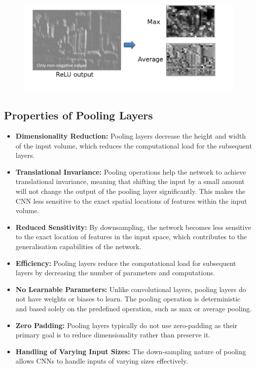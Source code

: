 \begin{figure}[H]
    \centering
    \includegraphics[width=0.5\linewidth]{img/max_avg_pool.png}
    
    
\end{figure}

\subsection{Properties of Pooling Layers}

\begin{itemize}
    \item \textbf{Dimensionality Reduction:} Pooling layers decrease the height and width of the input volume, which reduces the computational load for the subsequent layers.
    \item \textbf{Translational Invariance:} Pooling operations help the network to achieve translational invariance, meaning that shifting the input by a small amount will not change the output of the pooling layer significantly. This makes the CNN less sensitive to the exact spatial locations of features within the input volume.
    \item \textbf{Reduced Sensitivity:} By downsampling, the network becomes less sensitive to the exact location of features in the input space, which contributes to the generalisation capabilities of the network.
    \item \textbf{Efficiency:} Pooling layers reduce the computational load for subsequent layers by decreasing the number of parameters and computations.
    \item \textbf{No Learnable Parameters:} Unlike convolutional layers, pooling layers do not have weights or biases to learn. The pooling operation is deterministic and based solely on the predefined operation, such as max or average pooling.
    \item \textbf{Zero Padding:} Pooling layers typically do not use zero-padding as their primary goal is to reduce dimensionality rather than preserve it.
    \item \textbf{Handling of Varying Input Sizes:} The down-sampling nature of pooling allows CNNs to handle inputs of varying sizes effectively.
\end{itemize}

